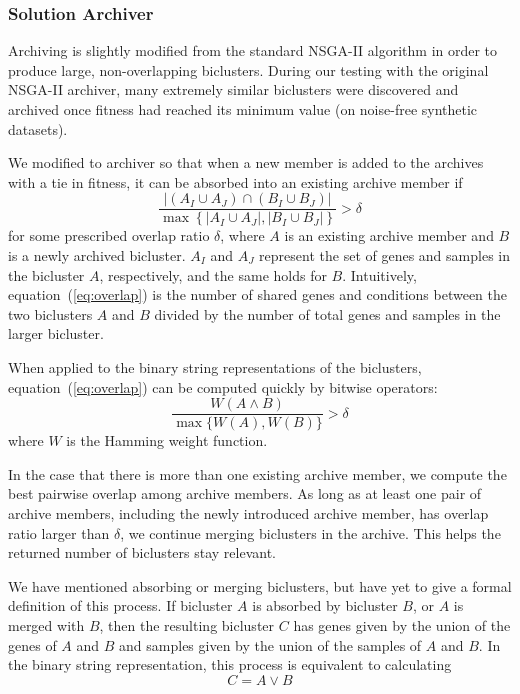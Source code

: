 \subsubsection{Solution Archiver}
Archiving is slightly modified from the standard NSGA-II algorithm in order to produce large, non-overlapping biclusters. During our testing with the original NSGA-II archiver, many extremely similar biclusters were discovered and archived once fitness had reached its minimum value (on noise-free synthetic datasets).

We modified to archiver so that when a new member is added to the archives with a tie in fitness, it can be absorbed into an existing archive member if
\begin{equation} \label{eq:overlap}
	\frac{\left\lvert \left( A_I \cup A_J \right) \cap \left( B_I \cup B_J \right)\right\rvert}
	{\max \left\{ \left\lvert A_I \cup A_J \right\rvert, \left\lvert B_I \cup B_J \right\rvert \right\}} > \delta
\end{equation}
for some prescribed overlap ratio $\delta$, where $A$ is an existing archive member and $B$ is a newly archived bicluster. $A_I$ and $A_J$ represent the set of genes and samples in the bicluster $A$, respectively, and the same holds for $B$. Intuitively, equation~(\ref{eq:overlap}) is the number of shared genes and conditions between the two biclusters $A$ and $B$ divided by the number of total genes and samples in the larger bicluster.

When applied to the binary string representations of the biclusters, equation~(\ref{eq:overlap}) can be computed quickly by bitwise operators:
\begin{equation}
	\frac{W(A \land B)}{\max \{ W(A), W(B)\}} > \delta
\end{equation}
where $W$ is the Hamming weight function.

In the case that there is more than one existing archive member, we compute the best pairwise overlap among archive members. As long as at least one pair of archive members, including the newly introduced archive member, has overlap ratio larger than $\delta$, we continue merging biclusters in the archive. This helps the returned number of biclusters stay relevant.

We have mentioned absorbing or merging biclusters, but have yet to give a formal definition of this process. If bicluster $A$ is absorbed by bicluster $B$, or $A$ is merged with $B$, then the resulting bicluster $C$ has genes given by the union of the genes of $A$ and $B$ and samples given by the union of the samples of $A$ and $B$. In the binary string representation, this process is equivalent to calculating
\begin{equation}
	C = A \lor B
\end{equation}

